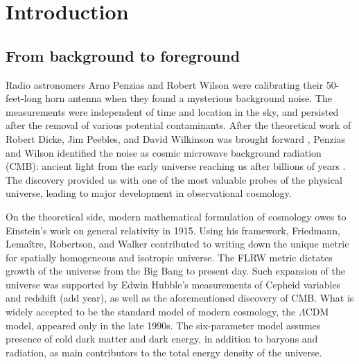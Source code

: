 
\chapter{Introduction}

\ifpdf
    \graphicspath{{Chapter1/Figs/Raster/}{Chapter1/Figs/PDF/}{Chapter1/Figs/}}
\else
    \graphicspath{{Chapter1/Figs/Vector/}{Chapter1/Figs/}}
\fi


\section{From background to foreground}

Radio astronomers Arno Penzias and Robert Wilson were calibrating their 50-feet-long horn antenna when they found a mysterious background noise. The measurements were independent of time and location in the sky, and persisted after the removal of various potential contaminants. After the theoretical work of Robert Dicke, Jim Peebles, and David Wilkinson was brought forward \cite{Dicke1965}, Penzias and Wilson identified the noise as cosmic microwave background radiation (CMB): ancient light from the early universe reaching us after billions of years \cite{Penzias1965}. The discovery provided us with one of the most valuable probes of the physical universe, leading to major development in observational cosmology.

On the theoretical side, modern mathematical formulation of cosmology owes to Einstein's work on general relativity in 1915. Using his framework, Friedmann, Lemaître, Robertson, and Walker contributed to writing down the unique metric for spatially homogeneous and isotropic universe. The FLRW metric dictates growth of the universe from the Big Bang to present day. Such expansion of the universe was supported by Edwin Hubble's measurements of Cepheid variables and redshift (add year), as well as the aforementioned discovery of CMB. What is widely accepted to be the standard model of modern cosmology, the $\Lambda$CDM model, appeared only in the late 1990s. The six-parameter model assumes presence of cold dark matter and dark energy, in addition to baryons and radiation, as main contributors to the total energy density of the universe.

